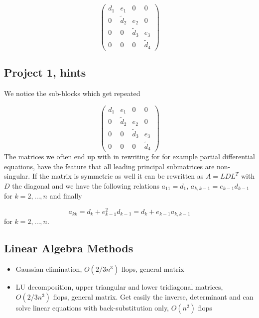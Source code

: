 \documentclass[%
twoside,                 %
final,                   %
10pt]{article}
\begin{document}
{{{{\[
   \left(\begin{array}{cccc}
                          d_1 & e_1 & 0 & 0 \\
                          0 & \tilde{d}_2 & e_2 & 0 \\
                          0 & 0 & \tilde{d}_3 & e_3 \\
                          0 & 0 & 0 & \tilde{d}_4
                      \end{array} \right)
\]

\subsection{Project 1, hints}

We notice the sub-blocks which get repeated

\[
   \left(\begin{array}{cccc}
                          d_1 & e_1 & 0 & 0 \\
                          0 & \tilde{d}_2 & e_2 & 0 \\
                          0 & 0 & \tilde{d}_3 & e_3 \\
                          0 & 0 & 0 & \tilde{d}_4
                      \end{array} \right)
\]
The matrices we often end up with in rewriting for for example partial differential equations,
have the feature that all leading principal submatrices are non-singular. If the matrix
is symmetric as well it can be rewritten as $A=LDL^T$ with $D$ the diagonal and we have the
following relations
$a_{11} = d_1$, $a_{k,k-1}=e_{k-1}d_{k-1}$ for $k=2,\dots,n$ and finally

\[
a_{kk} = d_k+e_{k-1}^2d_{k-1}=d_k+e_{k-1}a_{k,k-1}
\]
for $k=2,\dots,n$.

\subsection{Linear Algebra Methods}

\begin{itemize}
  \item Gaussian elimination, $O(2/3n^3)$ flops, general matrix

  \item LU decomposition, upper triangular and lower tridiagonal matrices, $O(2/3n^3)$ flops, general matrix. Get easily the inverse, determinant and can solve linear equations with back-substitution only, $O(n^2)$ flops


\end{itemize}}}}}
\end{document}
